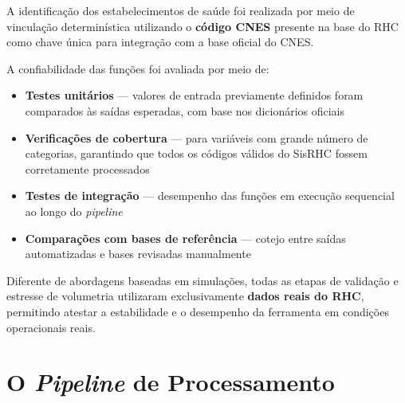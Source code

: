 \documentclass[
  brazilian,
  a4paper,
  oneside]{scrbook}
\providecommand{\tightlist}{%
  \setlength{\itemsep}{0pt}\setlength{\parskip}{0pt}}
\begin{document}
A identificação dos estabelecimentos de saúde foi realizada por meio de
vinculação determinística utilizando o \textbf{código CNES} presente na
base do RHC como chave única para integração com a base oficial do CNES.

A confiabilidade das funções foi avaliada por meio de:

\begin{itemize}
\tightlist
\item
  \textbf{Testes unitários} --- valores de entrada previamente definidos
  foram comparados às saídas esperadas, com base nos dicionários
  oficiais
\item
  \textbf{Verificações de cobertura} --- para variáveis com grande
  número de categorias, garantindo que todos os códigos válidos do
  SisRHC fossem corretamente processados
\item
  \textbf{Testes de integração} --- desempenho das funções em execução
  sequencial ao longo do \emph{pipeline}
\item
  \textbf{Comparações com bases de referência} --- cotejo entre saídas
  automatizadas e bases revisadas manualmente
\end{itemize}

\begin{tcolorbox}[enhanced jigsaw, arc=.35mm, bottomrule=.15mm, bottomtitle=1mm, breakable, colback=white, colbacktitle=quarto-callout-important-color!10!white, colframe=quarto-callout-important-color-frame, coltitle=black, left=2mm, leftrule=.75mm, opacityback=0, opacitybacktitle=0.6, rightrule=.15mm, title=\textcolor{quarto-callout-important-color}{\faExclamation}\hspace{0.5em}{Dados reais na validação}, titlerule=0mm, toprule=.15mm, toptitle=1mm]

Diferente de abordagens baseadas em simulações, todas as etapas de
validação e estresse de volumetria utilizaram exclusivamente
\textbf{dados reais do RHC}, permitindo atestar a estabilidade e o
desempenho da ferramenta em condições operacionais reais.

\end{tcolorbox}


\chapter{\texorpdfstring{O \emph{Pipeline} de
Processamento}{O Pipeline de Processamento}}\label{o-pipeline-de-processamento}
\end{document}
